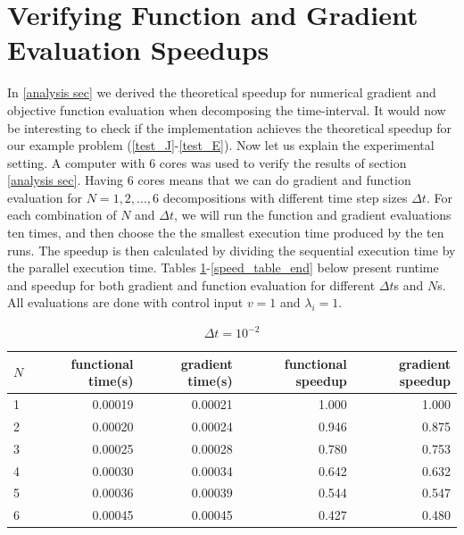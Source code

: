 \section{Verifying Function and Gradient Evaluation Speedups} \label{ver S sec}
In \ref{analysis sec} we derived the theoretical speedup for numerical gradient and objective function evaluation when decomposing the time-interval. It would now be interesting to check if the implementation achieves the theoretical speedup for our example problem (\ref{test_J}-\ref{test_E}). Now let us explain the experimental setting. A computer with 6 cores was used to verify the results of section \ref{analysis sec}. Having 6 cores means that we can do gradient and function evaluation for $N=1,2,...,6$ decompositions with different time step sizes $\Delta t$. For each combination of $N$ and $\Delta t$, we will run the function and gradient evaluations ten times, and then choose the the smallest execution time produced by the ten runs. The speedup is then calculated by dividing the sequential execution time by the parallel execution time. Tables \ref{Speed_table1}-\ref{speed_table_end} below present runtime and speedup for both gradient and function evaluation for different $\Delta t$s and $N$s. All evaluations are done with control input $v=1$ and $\lambda_i=1$.  
\\
\begin{table}[!h]
\centering
\caption{$\Delta t=10^{-2}$}
\label{Speed_table1}
\begin{tabular}{lrrrr}
\toprule
{}$N$ &  functional time(s) &  gradient time(s) &  functional speedup &  gradient speedup \\
\midrule
1 &           0.00019 &          0.00021 &            1.000 &          1.000 \\
2 &           0.00020 &          0.00024 &            0.946 &          0.875 \\
3 &           0.00025 &          0.00028 &            0.780 &          0.753 \\
4 &           0.00030 &          0.00034 &            0.642 &          0.632 \\
5 &           0.00036 &          0.00039 &            0.544 &          0.547 \\
6 &           0.00045 &          0.00045 &            0.427 &          0.480 \\
\bottomrule
\end{tabular}
\end{table}
